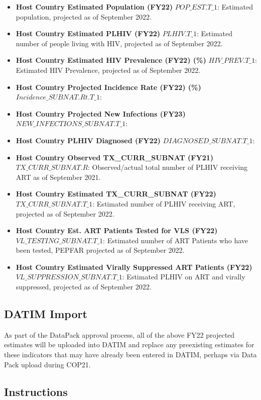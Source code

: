 \documentclass[
  openany]{book}
\begin{document}
\begin{itemize}
\item
  \textbf{Host Country Estimated Population (FY22)} \(POP\_EST.T\_1\):
  Estimated population, projected as of September 2022.
\item
  \textbf{Host Country Estimated PLHIV (FY22)} \(PLHIV.T\_1\): Estimated
  number of people living with HIV, projected as of September 2022.
\item
  \textbf{Host Country Estimated HIV Prevalence (FY22) (\%)}
  \(HIV\_PREV.T\_1\): Estimated HIV Prevalence, projected as of
  September 2022.
\item
  \textbf{Host Country Projected Incidence Rate (FY22) (\%)}
  \(Incidence\_SUBNAT.Rt.T\_1\):
\item
  \textbf{Host Country Projected New Infections (FY23)}
  \(NEW\_INFECTIONS\_SUBNAT.T\_1\):
\item
  \textbf{Host Country PLHIV Diagnosed (FY22)} \(DIAGNOSED\_SUBNAT.T\_1\):
\item
  \textbf{Host Country Observed TX\_CURR\_SUBNAT (FY21)}
  \(TX\_CURR\_SUBNAT.R\): Observed/actual total number of PLHIV
  receiving ART as of September 2021.
\item
  \textbf{Host Country Estimated TX\_CURR\_SUBNAT (FY22)}
  \(TX\_CURR\_SUBNAT.T\_1\): Estimated number of PLHIV receiving ART,
  projected as of September 2022.
\item
  \textbf{Host Country Est. ART Patients Tested for VLS (FY22)}
  \(VL\_TESTING\_SUBNAT.T\_1\): Estimated number of ART Patients who
  have been tested, PEPFAR projected as of September 2022.
\item
  \textbf{Host Country Estimated Virally Suppressed ART Patients
  (FY22)}\(VL\_SUPPRESSION\_SUBNAT.T\_1\): Estimated PLHIV on ART and
  virally suppressed, projected as of September 2022.
\end{itemize}

\hypertarget{datim-import-1}{%
\subsection{DATIM Import}\label{datim-import-1}}

As part of the DataPack approval process, all of the above FY22
projected estimates will be uploaded into DATIM and replace any
preexisting estimates for these indicators that may have already been
entered in DATIM, perhaps via Data Pack upload during COP21.

\hypertarget{instructions-1}{%
\subsection{Instructions}\label{instructions-1}}
\end{document}
